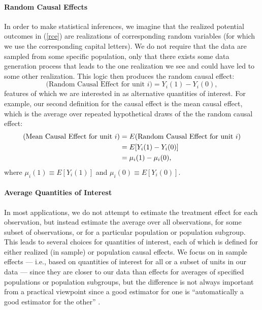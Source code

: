 \documentclass[11pt,titlepage]{article}
\begin{document}
\paragraph{Random Causal Effects} In order to make statistical
inferences, we imagine that the realized potential outcomes in
(\ref{rce}) are realizations of corresponding random variables (for
which we use the corresponding capital letters).  We do not require
that the data are sampled from some specific population, only that
there exists some data generation process that leads to the one
realization we see and could have led to some other realization.  This
logic then produces the random causal effect:
\begin{equation}
  \label{rance}
  \text{(Random Causal Effect for unit $i$)}  = Y_i(1) - Y_i(0),
\end{equation}
features of which we are interested in as alternative quantities of
interest.  For example, our second definition for the causal effect is
the mean causal effect, which is the average over repeated
hypothetical draws of the the random causal effect:
\begin{align}
  \label{meance} \text{(Mean Causal Effect for unit $i$)}
  &= E(\text{Random Causal Effect for unit $i$})\\
  &= E[Y_i(1) - Y_i(0)]\\ \notag &= \mu_i(1) - \mu_i(0),
\end{align}
where $\mu_i(1)\equiv E[Y_i(1)]$ and $\mu_i(0)\equiv E[Y_i(0)]$.

\paragraph{Average Quantities of Interest}
In most applications, we do not attempt to estimate the treatment
effect for each observation, but instead estimate the average over all
observations, for some subset of observations, or for a particular
population or population subgroup.  This leads to several choices for
quantities of interest, each of which is defined for either realized
(in sample) or population causal effects.  We focus on in sample
effects --- i.e., based on quantities of interest for all or a subset
of units in our data --- since they are closer to our data than
effects for averages of specified populations or population subgroups,
but the difference is not always important from a practical viewpoint
since a good estimator for one is ``automatically a good estimator for
the other'' \citep[p.6][]{Imbens04}.
\end{document}
